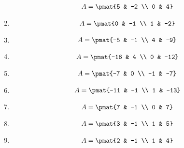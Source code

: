 \begin{enumerate}
\begin{align*}
A = \pmat{5 & -2 \\ 0 & 4}
\end{align*}

\item

\begin{align*}
A = \pmat{0 & -1 \\ 1 & -2}
\end{align*}

\item

\begin{align*}
A = \pmat{-5 & -1 \\ 4 & -9}
\end{align*}

\item

\begin{align*}
A = \pmat{-16 & 4 \\ 0 & -12}
\end{align*}

\item

\begin{align*}
A = \pmat{-7 & 0 \\ -1 & -7}
\end{align*}

\item

\begin{align*}
A = \pmat{-11 & -1 \\ 1 & -13}
\end{align*}

\item

\begin{align*}
A = \pmat{7 & -1 \\ 0 & 7}
\end{align*}

\item

\begin{align*}
A = \pmat{3 & -1 \\ 1 & 5}
\end{align*}

\item

\begin{align*}
A = \pmat{2 & -1 \\ 1 & 4}
\end{align*}


\end{enumerate}
